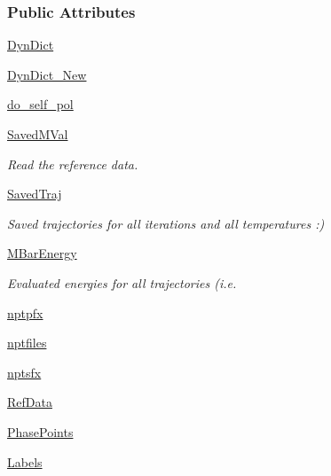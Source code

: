 \subsubsection*{Public Attributes}
\begin{DoxyCompactItemize}
\item 
\hyperlink{classforcebalance_1_1tinkerio_1_1Liquid__TINKER_a4a720f5a6f9808afc07b7baf08dcbceb}{Dyn\-Dict}
\item 
\hyperlink{classforcebalance_1_1tinkerio_1_1Liquid__TINKER_af2dfb536a3fbe64e5e657c5edc1d656a}{Dyn\-Dict\-\_\-\-New}
\item 
\hyperlink{classforcebalance_1_1liquid_1_1Liquid_a2cf65dd56f058636e68a0b3bf2af210e}{do\-\_\-self\-\_\-pol}
\item 
\hyperlink{classforcebalance_1_1liquid_1_1Liquid_a5b9df1bf79a641156429e292f47b6afd}{Saved\-M\-Val}
\begin{DoxyCompactList}\small\item\em Read the reference data. \end{DoxyCompactList}\item 
\hyperlink{classforcebalance_1_1liquid_1_1Liquid_a0da0c00cdc193c9c470d7e528043fb99}{Saved\-Traj}
\begin{DoxyCompactList}\small\item\em Saved trajectories for all iterations and all temperatures \-:) \end{DoxyCompactList}\item 
\hyperlink{classforcebalance_1_1liquid_1_1Liquid_a6c00a87ae43f535118b77d41af51a5d7}{M\-Bar\-Energy}
\begin{DoxyCompactList}\small\item\em Evaluated energies for all trajectories (i.\-e. \end{DoxyCompactList}\item 
\hyperlink{classforcebalance_1_1liquid_1_1Liquid_a0560795c55fc1b5d7668951c77ad97ab}{nptpfx}
\item 
\hyperlink{classforcebalance_1_1liquid_1_1Liquid_a2030a7e21fcce59155a0258daed4f2f7}{nptfiles}
\item 
\hyperlink{classforcebalance_1_1liquid_1_1Liquid_a4125a209929444b7cbfbd60b466dc763}{nptsfx}
\item 
\hyperlink{classforcebalance_1_1liquid_1_1Liquid_a472f32bbaf18b8ead19b9156f305b8fc}{Ref\-Data}
\item 
\hyperlink{classforcebalance_1_1liquid_1_1Liquid_a2c10490d9073a069bd19361f386422ef}{Phase\-Points}
\item 
\hyperlink{classforcebalance_1_1liquid_1_1Liquid_a50f976d2d3d6a1c261756035a26390e2}{Labels}

\end{DoxyCompactItemize}
